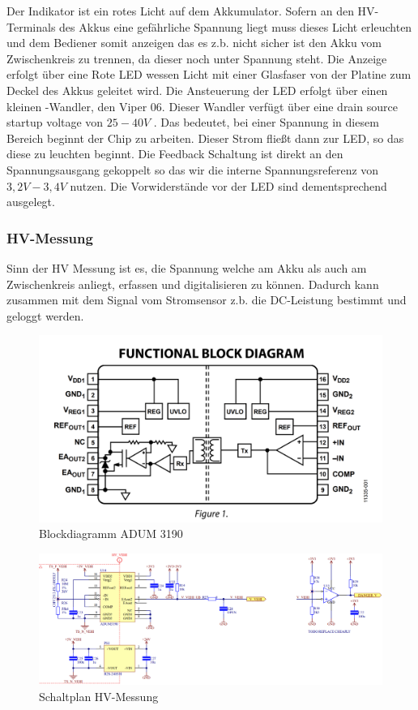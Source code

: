 Der  Indikator ist ein rotes Licht auf dem Akkumulator. Sofern an den \ac{HV}-Terminals des Akkus eine gefährliche Spannung liegt muss dieses Licht erleuchten und dem Bediener somit anzeigen das es z.b. nicht sicher ist den Akku vom Zwischenkreis zu trennen, da dieser noch unter Spannung steht. Die Anzeige erfolgt über eine Rote \ac{LED} wessen Licht mit einer Glasfaser von der Platine zum Deckel des Akkus geleitet wird. Die Ansteuerung der \ac{LED} erfolgt über einen kleinen -Wandler, den Viper 06. Dieser Wandler verfügt über eine drain source startup voltage von \ensuremath{25-40V} \cite{Viper06}. Das bedeutet, bei einer Spannung in diesem Bereich beginnt der Chip zu arbeiten. Dieser Strom fließt dann zur \ac{LED}, so das diese zu leuchten beginnt. Die Feedback Schaltung ist direkt an den Spannungsausgang gekoppelt so das wir die interne Spannungsreferenz von \ensuremath{3,2 V - 3,4 V} nutzen. Die Vorwiderstände vor der \ac{LED} sind dementsprechend ausgelegt.

\FloatBarrier
\subsubsection{\ac{HV}-Messung}
Sinn der \ac{HV} Messung ist es, die Spannung welche am Akku als auch am Zwischenkreis anliegt, erfassen und digitalisieren zu können. Dadurch kann zusammen mit dem Signal vom Stromsensor z.b. die \ac{DC}-Leistung bestimmt und geloggt werden. 

\begin{figure}
	\centering
	\includegraphics[width=0.4\linewidth]{"bilder/Blockdiagramm ADUM3190"}
	\caption{Blockdiagramm ADUM 3190}
	\label{fig:blockdiagramm-adum3190}
\end{figure}

\begin{figure}
	\centering
	\includegraphics[width=0.9\linewidth]{bilder/HV_Measurement_PNG}
	\caption{Schaltplan \ac{HV}-Messung}
	\label{fig:hvmeasurementpng}
\end{figure}

